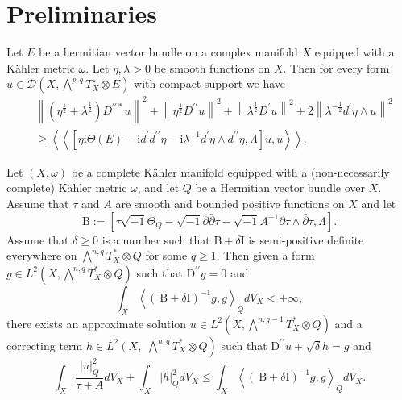 \documentclass[lang=en,12pt,twoside]{textbook}
\newcommand{\llangle}{\left\langle\!\left\langle}
\newcommand{\rrangle}{\right\rangle\!\right\rangle}
\begin{document}
\section{Preliminaries}
\begin{lemma}\label{lem:priori-estimate}
  Let $E$ be a hermitian vector bundle on a complex manifold $X$ equipped with a Kähler metric $\omega$. Let $\eta, \lambda>0$ be smooth functions on $X$. Then for every form $u \in \mathcal{D}\left(X, \bigwedge^{p, q} T_X^{\star} \otimes E\right)$ with compact support we have
$$
\begin{aligned}
&\left\|\left(\eta^{\frac{1}{2}}+\lambda^{\frac{1}{2}}\right) D^{\prime \prime *} u\right\|^2  +\left\|\eta^{\frac{1}{2}} D^{\prime \prime} u\right\|^2+\left\|\lambda^{\frac{1}{2}} D^{\prime} u\right\|^2+2\left\|\lambda^{-\frac{1}{2}} d^{\prime} \eta \wedge u\right\|^2 \\
& \geqslant\llangle\left[\eta \mathrm{i} \Theta(E)-\mathrm{i} d^{\prime} d^{\prime \prime} \eta-\mathrm{i} \lambda^{-1} d^{\prime} \eta \wedge d^{\prime \prime} \eta, \Lambda\right] u, u\rrangle .
\end{aligned}
$$
\end{lemma}


\begin{lemma}\label{lem:L2existence}
  Let $(X, \omega)$ be a complete K\"ahler manifold equipped with a (non-necessarily complete) K\"ahler metric $\omega$, and let $Q$ be a Hermitian vector bundle over $X$. Assume that $\tau$ and $A$ are smooth and bounded positive functions on $X$ and let $$\mathrm{B}:=\left[\tau \sqrt{-1} \Theta_Q-\sqrt{-1} \partial \bar{\partial} \tau-\sqrt{-1} A^{-1} \partial \tau \wedge \bar{\partial} \tau, \Lambda\right].$$ Assume that $\delta \geq 0$ is a number such that $\mathrm{B}+\delta \mathrm{I}$ is semi-positive definite everywhere on $\bigwedge^{n, q} T_X^* \otimes Q$ for some $q \geq 1$. Then given a form $g \in L^2\left(X, \bigwedge^{n, q} T_X^* \otimes Q\right)$ such that $\mathrm{D}^{\prime \prime} g=0$ and $$\int_X\left\langle(\mathrm{~B}+\delta \mathrm{I})^{-1} g, g\right\rangle_Q d V_X<+\infty,$$ there exists an approximate solution $u \in L^2\left(X, \bigwedge^{n, q-1} T_X^* \otimes Q\right)$ and a correcting term $h \in L^2\left(X, \right.$ $\left.\bigwedge^{n, q} T_X^* \otimes Q\right)$ such that $\mathrm{D}^{\prime \prime} u+\sqrt{\delta} h=g$ and
$$
\int_X \frac{|u|_Q^2}{\tau+A} d V_X+\int_X|h|_Q^2 d V_X \leq \int_X\left\langle(\mathrm{~B}+\delta \mathrm{I})^{-1} g, g\right\rangle_Q d V_X .
$$
\end{lemma}
\end{document}
